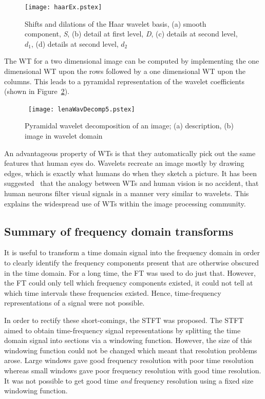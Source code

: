 \documentclass[12pt]{report}
\begin{document}
\begin{figure}[htb]
	\begin{center}
		\texttt{[image: haarEx.pstex]}
		\caption{Shifts and dilations of the Haar wavelet basis, (a) smooth component, \emph{S}, 
		(b) detail at first level, \emph{D}, (c) details at second level, $d_{1}$, (d) details at
		second level, $d_{2}$}
		\label{fig:haarEx}
	\end{center}
\end{figure}


The WT for a two dimensional image can be computed by implementing
the one dimensional WT upon the rows followed by a one dimensional WT upon the columns.
This leads to a pyramidal representation of the wavelet coefficients (shown in Figure~\ref{fig:lenaWavDecomp3}).
\begin{figure}[htb]
	\centerline{ \hbox{
		\texttt{[image: lenaWavDecomp5.pstex]}
	}}
		\caption{Pyramidal wavelet decomposition of an image; (a) description, (b) image in wavelet domain}
		\label{fig:lenaWavDecomp3}

\end{figure}
An advantageous property of WTs is that they automatically pick out the same features that human eyes do.
Wavelets recreate an image mostly by drawing edges, which is exactly what humans do when they sketch a picture. 
It has been suggested~\cite{waveletsHumanEyes} that the analogy between WTs and human vision is no accident, that human neurons
filter visual signals in a manner very similar to wavelets. This explains the widespread use of WTs within the image 
processing community.

\subsection{Summary of frequency domain transforms}
It is useful to transform a time domain signal into the frequency domain in order to clearly 
identify the frequency components present that are otherwise obscured in the time domain.
For a long time, the FT was used to do just that. However, the FT could only tell which 
frequency components existed, it could not tell at which time intervals these frequencies existed.
Hence, time-frequency representations of a signal were not possible.

In order to rectify these short-comings, the STFT was proposed. The STFT aimed to obtain
time-frequency signal representations by splitting the time domain signal into sections
via a windowing function. However, the size of this windowing function could not be changed
which meant that resolution problems arose. Large windows gave good frequency resolution 
with poor time resolution whereas small windows gave poor frequency resolution
with good time resolution. It was not possible to get good time \emph{and} frequency resolution
using a fixed size windowing function.
\end{document}
